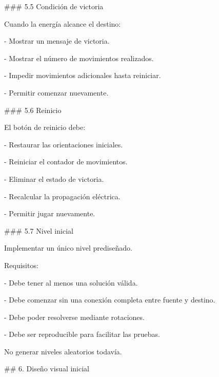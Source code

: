 \par\smallskip
\noindent \#\#\# 5.5 Condición de victoria\par
\par\smallskip
\noindent Cuando la energía alcance el destino:\par
\par\smallskip
\noindent - Mostrar un mensaje de victoria.\par
\noindent - Mostrar el número de movimientos realizados.\par
\noindent - Impedir movimientos adicionales hasta reiniciar.\par
\noindent - Permitir comenzar nuevamente.\par
\par\smallskip
\noindent \#\#\# 5.6 Reinicio\par
\par\smallskip
\noindent El botón de reinicio debe:\par
\par\smallskip
\noindent - Restaurar las orientaciones iniciales.\par
\noindent - Reiniciar el contador de movimientos.\par
\noindent - Eliminar el estado de victoria.\par
\noindent - Recalcular la propagación eléctrica.\par
\noindent - Permitir jugar nuevamente.\par
\par\smallskip
\noindent \#\#\# 5.7 Nivel inicial\par
\par\smallskip
\noindent Implementar un único nivel prediseñado.\par
\par\smallskip
\noindent Requisitos:\par
\par\smallskip
\noindent - Debe tener al menos una solución válida.\par
\noindent - Debe comenzar sin una conexión completa entre fuente y destino.\par
\noindent - Debe poder resolverse mediante rotaciones.\par
\noindent - Debe ser reproducible para facilitar las pruebas.\par
\par\smallskip
\noindent No generar niveles aleatorios todavía.\par
\par\smallskip
\noindent \#\# 6. Diseño visual inicial\par
